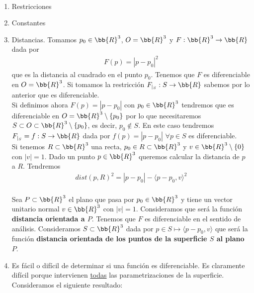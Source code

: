 \begin{ejemplo}\
    \begin{enumerate}
        \item Restricciones
        \item Constantes
        \item[$a_2$)] Distancias. Tomamos $p_0\in \bb{R}^3$, $O=\bb{R}^3$ y $F:\bb{R}^3 \to \bb{R}$ dada por 
        \begin{gather*}
            F(p) = |p-p_0|^2
        \end{gather*}
        que es la distancia al cuadrado en el punto $p_0$. Tenemos que $F$ es diferenciable en $O=\bb{R}^3$. Si tomamos la restricción $F_{|_S}:S \to \bb{R}$ sabemos por lo anterior que es diferenciable.\\

        Si definimos ahora $F(p)=|p-p_0|$ con $p_0\in \bb{R}^3$ tendremos que es diferenciable en $O = \bb{R}^3\setminus \{p_0\}$ por lo que necesitaremos $S\subset O \subset \bb{R}^3 \setminus \{p_0\}$, es decir, $p_0\notin S$. En este caso tendremos $F_{|_S}=f:S\to \bb{R}$ dada por $f(p)=|p-p_0|$ $\forall p \in S$ es diferenciable.\\

        Si tenemos $R\subset \bb{R}^3$ una recta, $p_0\in R\subset \bb{R}^3$ y $v\in \bb{R}^3\setminus\{0\}$ con $|v|=1$. Dado un punto $p\in \bb{R}^3$ queremos calcular la distancia de $p$ a $R$. Tendremos
        \begin{gather*}
            dist(p,R)^2 = |p-p_0| - \langle p-p_0, v \rangle^2
        \end{gather*}\\

        Sea $P\subset \bb{R}^3$ el plano que pasa por $p_0\in \bb{R}^3$ y tiene un vector unitario normal $v\in \bb{R}^3$ con $|v|=1$. Consideramos 
        \Func{F}{O=\bb{R}^3}{\bb{R}}{p}{F(p)=\langle p-p_0,v \rangle}
        que será la función \textbf{distancia orientada a $P$}. Tenemos que $F$ es diferenciable en el sentido de análisis. Consideramos $S\subset \bb{R}^3$ dada por $p\in S \mapsto \langle p-p_0, v\rangle$ que será la función \textbf{distancia orientada de los puntos de la superficie $S$ al plano $P$}.

        \item[a)] Es fácil o difícil de determinar si una función es diferenciable. Es claramente difícil porque intervienen \underline{todas} las parametrizaciones de la superficie. Consideramos el siguiente resultado:\\
        

\end{enumerate}
\end{ejemplo}
